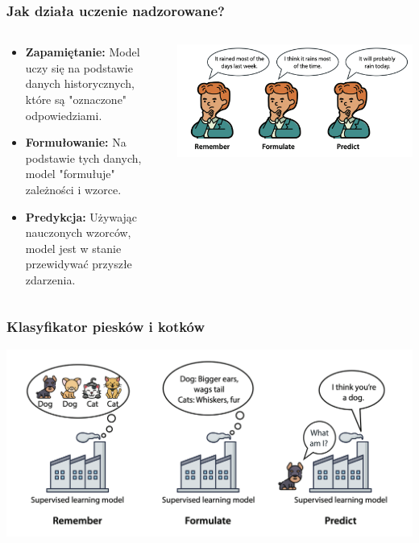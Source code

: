 \documentclass[smaller]{beamer}
\begin{document}

\begin{frame}
\frametitle{Jak działa uczenie nadzorowane?}


\begin{columns}
    \begin{column}{0.4\textwidth}
        \begin{itemize}
            \item \textbf{Zapamiętanie:} Model uczy się na podstawie danych historycznych, które są "oznaczone" odpowiedziami.
            \item \textbf{Formułowanie:} Na podstawie tych danych, model "formułuje" zależności i wzorce.
            \item \textbf{Predykcja:} Używając nauczonych wzorców, model jest w stanie przewidywać przyszłe zdarzenia.
        \end{itemize}
    \end{column}

    \begin{column}{0.6\textwidth}
        \includegraphics[width=\textwidth]{../manifest/r-f-p-1} 
    \end{column}
\end{columns}

\end{frame}


\begin{frame}
\frametitle{Klasyfikator piesków i kotków}
\includegraphics[width=\textwidth,height=0.8\textheight,keepaspectratio]{../manifest/r-f-p-2.png}
\end{frame}
\end{document}
